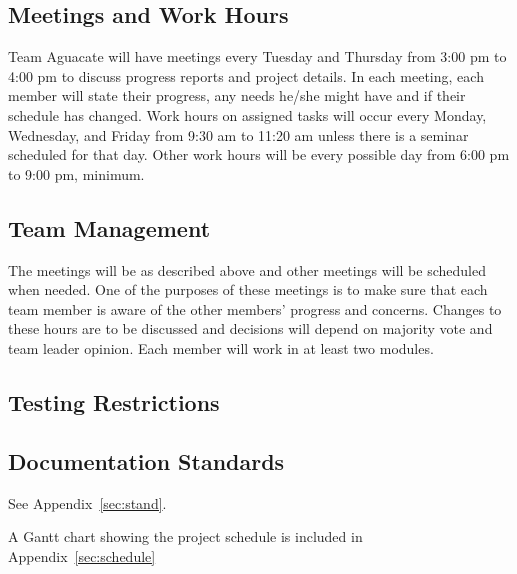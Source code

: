 
\subsection{Meetings and Work Hours}
Team Aguacate will have meetings every Tuesday and Thursday from 3:00 pm to 4:00 pm to discuss progress reports and project details.  In each meeting, each member will state their progress, any needs he/she might have and if their schedule has changed.  Work hours on assigned tasks will occur every Monday, Wednesday, and Friday from 9:30 am to 11:20 am unless there is a seminar scheduled for that day.  Other work hours will be every possible day from 6:00 pm to 9:00 pm, minimum.

\subsection{Team Management}
The meetings will be as described above and other meetings will be scheduled when needed.  One of the purposes of these meetings is to make sure that each team member is aware of the other members' progress and concerns.  Changes to these hours are to be discussed and decisions will depend on majority vote and team leader opinion.  Each member will work in at least two modules.

\subsection{Testing Restrictions}

\subsection{Documentation Standards}
See Appendix~\ref{sec:stand}.

A Gantt chart showing the project schedule is included in Appendix~\ref{sec:schedule} 